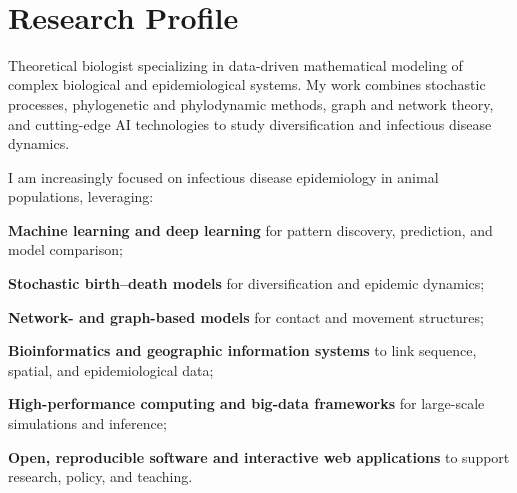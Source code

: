 
\newcommand{\sectionbar}{%
  \color{rug-red}\rule[-0.3ex]{2mm}{2.1ex}\hspace{0.7em}%
}

\begin{center}
  {\huge\bfseries \name}\\[0.3em]
\end{center}

\vspace{0.5em}

\section*{Research Profile}

Theoretical biologist specializing in data-driven mathematical modeling of complex biological and epidemiological systems. My work combines stochastic processes, phylogenetic and phylodynamic methods, graph and network theory, and cutting-edge AI technologies to study diversification and infectious disease dynamics.

I am increasingly focused on infectious disease epidemiology in animal populations, leveraging:
\begin{fancyitem}
  \item \textbf{Machine learning and deep learning}
        for pattern discovery, prediction, and model comparison;
  \item \textbf{Stochastic birth--death models}
        for diversification and epidemic dynamics;
  \item \textbf{Network- and graph-based models}
        for contact and movement structures;
  \item \textbf{Bioinformatics and geographic information systems}
        to link sequence, spatial, and epidemiological data;
  \item \textbf{High-performance computing and big-data frameworks}
        for large-scale simulations and inference;
  \item \textbf{Open, reproducible software and interactive web applications}
        to support research, policy, and teaching.
\end{fancyitem}

